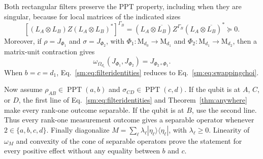 \documentclass[aps,prl,reprint,superscriptaddress,nofootinbib]{revtex4-2}
\newcommand{\M}{\mathrm{M}}
\newcommand{\PPT}{\operatorname{PPT}}
\begin{document}
Both rectangular filters preserve the PPT property, including when they are
singular, because for local matrices of the indicated sizes
\begin{equation}
 \left[(L_A\otimes L_B)Z(L_A\otimes L_B)^*\right]^{\Gamma_B}
 =(L_A\otimes\overline{L_B})Z^{\Gamma_B}
  (L_A\otimes\overline{L_B})^*\succeq0.
\label{sm:eq:pptfilter}
\end{equation}
Moreover, if \(\rho=J_{\Phi_1}\) and \(\sigma=J_{\Phi_2}\), with
\(\Phi_1:\M_{d_0}\to\M_{d_1}\) and
\(\Phi_2:\M_{d_1}\to\M_{d_2}\), then a matrix-unit contraction gives
\begin{equation}
 \omega_{\Omega_{d_1}}(J_{\Phi_1},J_{\Phi_2})
 =J_{\Phi_2\circ\Phi_1}.
\label{sm:eq:swappingchoi}
\end{equation}
When \(b=c=d_1\), Eq.~\eqref{sm:eq:filteridentities} reduces to
Eq.~\eqref{sm:eq:swappingchoi}.

Now assume \(\rho_{AB}\in\PPT(a,b)\) and
\(\sigma_{CD}\in\PPT(c,d)\).  If the qubit is at \(A\), \(C\), or \(D\),
the first line of Eq.~\eqref{sm:eq:filteridentities} and
Theorem~\ref{thm:anywhere} make every rank-one outcome separable.  If the
qubit is at \(B\), use the second line.  Thus every rank-one measurement
outcome gives a separable operator whenever \(2\in\{a,b,c,d\}\).  Finally diagonalize
\(M=\sum_\ell\lambda_\ell|\eta_\ell\rangle\langle\eta_\ell|\), with
\(\lambda_\ell\geq0\).  Linearity of \(\omega_M\) and convexity of the
cone of separable operators prove the statement for every positive effect
without any equality
between \(b\) and \(c\).
\end{document}
